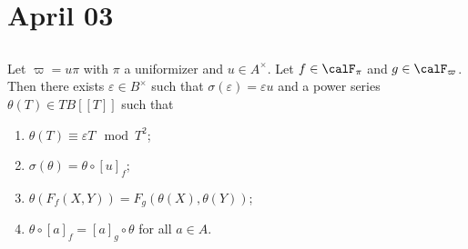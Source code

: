 \section{April 03}


\subsection{}

  \begin{proposition}
    Let $\varpi = u \pi$ with $\pi$ a uniformizer and $u \in A^\times$.
    Let $f \in \calF_\pi$ and $g \in \calF_\varpi$.
    Then there exists $\varepsilon \in B^\times$ such that $\sigma(\varepsilon) = \varepsilon u$ and a power series $\theta(T) \in T B[[T]]$ such that
    \begin{enumerate}
      \item $\theta(T) \equiv \varepsilon T \mod T^2$;
      \item $\sigma(\theta) = \theta \circ [u]_f$;
      \item $\theta(F_f(X,Y)) = F_g(\theta(X), \theta(Y))$;
      \item $\theta \circ [a]_f = [a]_g \circ \theta$ for all $a \in A$.
    \end{enumerate}
  \end{proposition}
